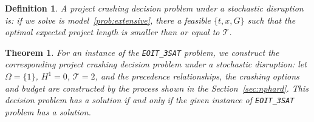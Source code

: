 \documentclass[11pt]{article}
\newtheorem{theorem}{Theorem}
\newtheorem{definition}{Definition}
\begin{document}
	\begin{definition}
		A project crashing decision problem under a stochastic disruption is: if we solve is model~\ref{prob:extensive}, there a feasible \(\{t,x,G\}\) such that the optimal expected project length is smaller than or equal to \(\mathcal{T}\).
	\end{definition}
	\begin{theorem}\label{thm:npcomplete}
		For an instance of the \verb|EOIT_3SAT| problem, we construct the corresponding project crashing decision problem under a stochastic disruption: let \(\Omega = \{1\}\), \(H^1 = 0\), \(\mathcal{T} = 2\), and the precedence relationships, the crashing options and budget are constructed by the process shown in the Section~\ref{sec:nphard}. This decision problem has a solution if and only if the given instance of \verb|EOIT_3SAT| problem has a solution.
	\end{theorem}
\end{document}
